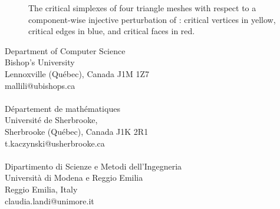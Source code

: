 \documentclass[12pt]{article}
\begin{document}
\begin{figure}
\begin{center}
  \caption{The critical simplexes of four triangle meshes with respect to a component-wise injective perturbation of : critical vertices  in yellow,  critical edges  in blue,  and  critical faces  in red.
 }
\end{center}
\label{fig:space}
\end{figure}




\medskip



\noindent Department of Computer Science\\
Bishop's University\\
Lennoxville (Qu\'ebec),  Canada J1M 1Z7\\
mallili@ubishops.ca
\\~\\
D\'epartement de math\'ematiques\\
Universit\'e de Sherbrooke,\\
Sherbrooke (Qu\'ebec), Canada J1K 2R1\\
t.kaczynski@usherbrooke.ca
\\~\\
\noindent Dipartimento di Scienze e Metodi dell'Ingegneria\\
Universit\`a di Modena e Reggio Emilia\\
Reggio Emilia, Italy
\\
claudia.landi@unimore.it
\end{document}
